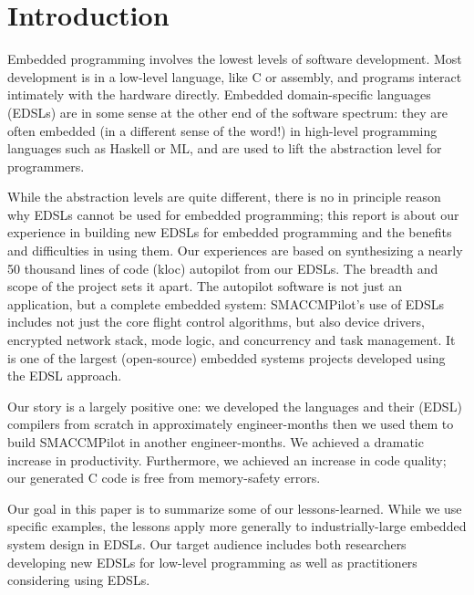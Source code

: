 \section{Introduction}

Embedded programming involves the lowest levels of software development.  Most
development is in a low-level language, like C or assembly, and programs
interact intimately with the hardware directly.  Embedded domain-specific
languages (EDSLs) are in some sense at the other end of the software
spectrum: they are often embedded (in a different sense of the word!) in
high-level programming languages such as Haskell or ML, and are used to
lift the abstraction level for programmers.

While the abstraction levels are quite different, there is no in principle
reason why EDSLs cannot be used for embedded programming; this report is about
our experience in building new EDSLs for embedded programming and the benefits
and difficulties in using them.  Our experiences are based on synthesizing a
nearly 50 thousand lines of code (kloc) autopilot from our EDSLs.  The breadth
and scope of the project sets it apart.  The autopilot software is not just an
application, but a complete embedded system: SMACCMPilot's use of EDSLs includes
not just the core flight control algorithms, but also device drivers, encrypted
network stack, mode logic, and concurrency and task management.  It is one of
the largest (open-source) embedded systems projects developed using the EDSL
approach.

Our story is a largely positive one: we developed the languages and their (EDSL)
compilers from scratch in approximately  engineer-months then we used
them to build SMACCMPilot in another  engineer-months.  We achieved a
dramatic increase in productivity.  Furthermore, we achieved an increase in
code quality; our generated C code is free from memory-safety errors.

Our goal in this paper is to summarize some of our lessons-learned.  While we
use specific examples, the lessons apply more generally to industrially-large
embedded system design in EDSLs.  Our target audience includes both researchers
developing new EDSLs for low-level programming as well as practitioners
considering using EDSLs.



